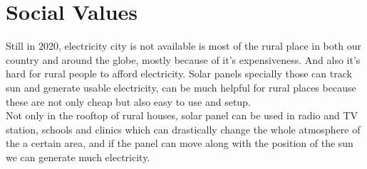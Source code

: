 \section*{Social Values}
Still in 2020, electricity city is not available is most of the rural place in both our country and around the globe, mostly because of it's expensiveness. And also it's hard for rural people to afford electricity. Solar panels specially those can track sun and generate usable electricity, can be much helpful for rural places because these are not only cheap but also easy to use and setup.\\
Not only in the rooftop of rural houses, solar panel can be used in radio and TV station, schools and clinics which can drastically change the whole atmosphere of the a certain area, and if the panel can move along with the position of the sun we can generate much electricity. 